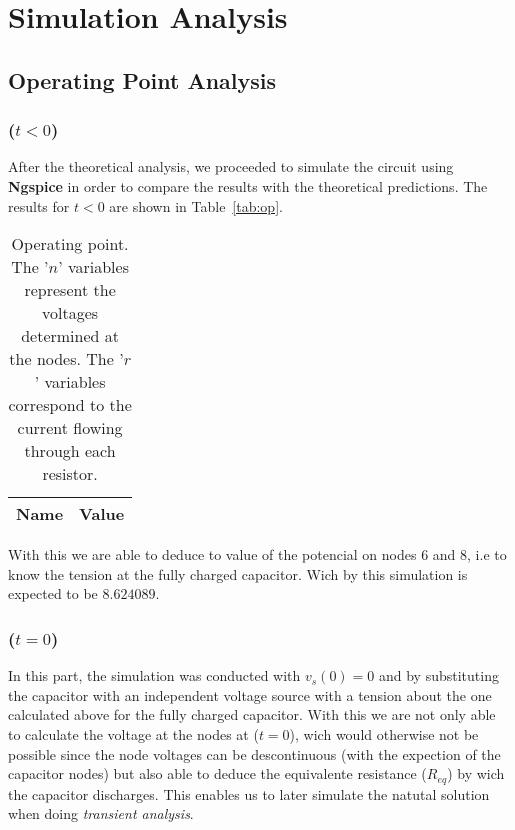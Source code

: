 \newpage

\section{Simulation Analysis}
\label{sec:simulation}

\subsection{Operating Point Analysis}
\label{sec:op_point}

\subsubsection{($t < 0$)}

After the theoretical analysis, we proceeded to simulate the circuit using {\bf Ngspice} in order to compare the results with the theoretical predictions. The results for $t < 0$ are shown in Table~\ref{tab:op}.

\begin{table}[H]
	\centering
	\begin{tabular}{|l|c|}
		\hline    
		    {\bf Name} & {\bf Value} \\
                    \hline
                    \hline
		
	\end{tabular}
	\caption{Operating point. The '$n$' variables represent the voltages determined at the nodes. The '$r$' variables correspond to the current flowing through each resistor.}
	\label{tab:op1}
\end{table}

\par With this we are able to deduce to value of the potencial on nodes 6 and 8, i.e to know the tension at the fully charged capacitor. Wich by this simulation is expected to be $8.624089$.

\subsubsection{($t = 0$)}

In this part, the simulation was conducted with $v_s(0) = 0$ and by substituting the capacitor with an independent voltage source with a tension about the one calculated above for the fully charged capacitor. With this we are not only able to calculate the voltage at the nodes at ($t = 0$), wich would otherwise not be possible since the node voltages can be descontinuous (with the expection of the capacitor nodes) but also able to deduce the equivalente resistance ($R_{eq}$) by wich the capacitor discharges. This enables us to later simulate the natutal solution when doing \emph{transient analysis}.

